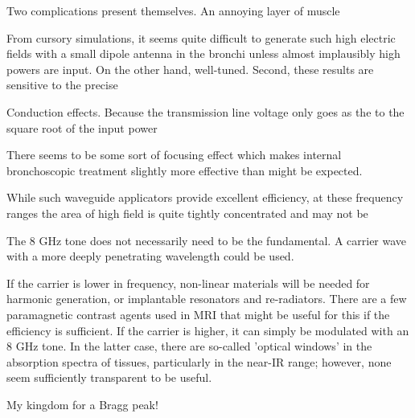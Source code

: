 \documentclass[paper.tex]{subfiles}
\begin{document}
Two complications present themselves. An annoying layer of muscle 


From cursory simulations, it seems quite difficult to generate such high electric fields with a small dipole antenna in the bronchi unless almost implausibly high powers are input. On the other hand, well-tuned. Second, these results are sensitive to the precise




Conduction effects. Because the transmission line voltage only goes as the to the square root of the input power

There seems to be some sort of focusing effect which makes internal bronchoscopic treatment slightly more effective than might be expected.


While such waveguide applicators provide excellent efficiency, at these frequency ranges the area of high field is quite tightly concentrated and may not be 



The 8 GHz tone does not necessarily need to be the fundamental. A carrier wave with a more deeply penetrating wavelength could be used. 

If the carrier is lower in frequency, non-linear materials\cite{Theory1973} will be needed for harmonic generation, or implantable resonators and re-radiators. There are a few paramagnetic contrast agents used in MRI that might be useful for this if the efficiency is sufficient. If the carrier is higher, it can simply be modulated with an 8 GHz tone. In the latter case, there are so-called 'optical windows' in the absorption spectra of tissues, particularly in the near-IR range; however, none seem sufficiently transparent to be useful.

My kingdom for a Bragg peak!



\clearpage
\printbibliography[heading=none, title={}, keyword={Flagship}]
\printbibliography[heading=none, title={}, keyword={standards}]
\end{document}
